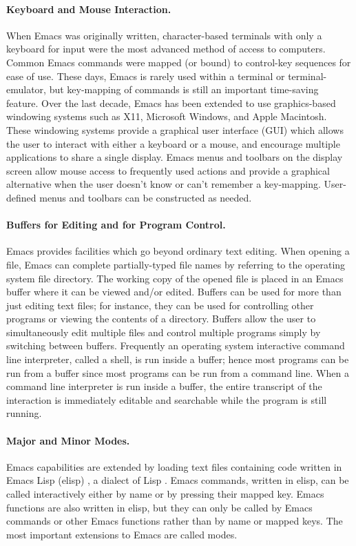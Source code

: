 \documentclass{article}
\begin{document}
\paragraph{Keyboard and Mouse Interaction.}
When Emacs was originally written, character-based terminals with only
a keyboard for input were the most advanced method of access to
computers.  Common Emacs commands were mapped (or bound) to control-key
sequences for ease of use.  These days, Emacs is
rarely used within a terminal or terminal-emulator, but key-mapping of
commands is still an important time-saving feature.  Over the last
decade, Emacs has been extended to use graphics-based windowing
systems such as X11, Microsoft Windows, and Apple Macintosh.  These
windowing systems provide a graphical user interface (GUI) which
allows the user to interact with either a keyboard or a mouse, and encourage
multiple applications to share a single display.  Emacs menus and
toolbars on the display screen allow mouse access to frequently used
actions and provide a graphical alternative
when the user doesn't know or can't remember a key-mapping.  User-defined
menus and toolbars can be constructed as needed.

\paragraph{Buffers for Editing and for Program Control.}
Emacs provides facilities which go beyond ordinary text editing.  When
opening a file, Emacs can complete partially-typed file names by
referring to the operating system file directory.  The working copy of
the opened file is placed in an Emacs buffer where it can be viewed
and/or edited.  Buffers can be used for more than just editing text
files; for instance, they can be used for controlling other programs
or viewing the contents of a directory.  Buffers allow the user to simultaneously
edit multiple files and control multiple
programs simply by switching between buffers.  Frequently an operating
system interactive command line interpreter, called a shell,
is run inside a buffer; hence most programs can be run from a buffer
since most programs can be run from a command line.  When a command line
interpreter is run inside a buffer, the entire
transcript of the interaction is immediately editable and searchable while the
program is still running.

\paragraph{Major and Minor Modes.}
Emacs capabilities are extended by loading text files containing code
written in Emacs Lisp (elisp) \citep{RChassell1999}, a dialect of Lisp
\citep{PGraham:1996}.  Emacs commands, written in elisp,
can be called interactively either by name or by pressing their mapped key.
Emacs functions are also written in elisp, but they can only be called
by Emacs commands or other Emacs functions rather than by
name or mapped keys.  The most important extensions to Emacs are called
modes.
\end{document}
